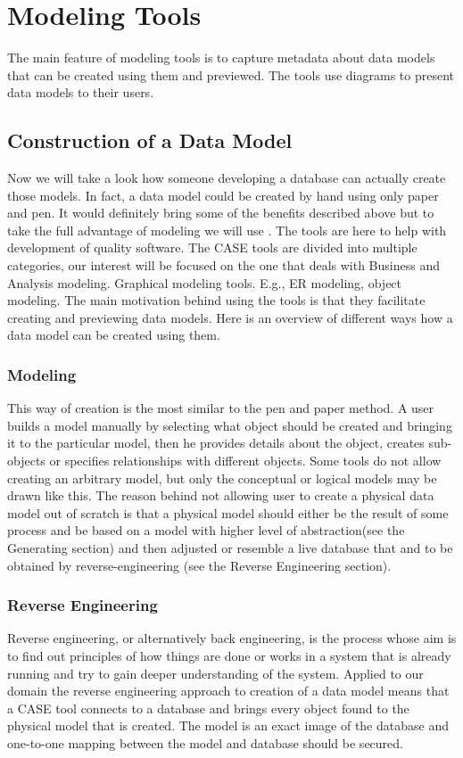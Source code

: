 \chapter{Modeling Tools}

The main feature of modeling tools is to capture metadata about data models that can be created using them and previewed. The tools use diagrams to present data models to their users.

\section{Construction of a Data Model}

Now we will take a look how someone developing a database can actually create those models.
In fact, a data model could be created by hand using only paper and pen. It would definitely bring some of the benefits described above but to take the full advantage of modeling we will use . The tools are here to help with development of quality software. The CASE tools are divided into multiple categories, our interest will be focused on the one that deals with Business and Analysis modeling. Graphical modeling tools. E.g., ER modeling, object modeling.
The main motivation behind using the tools is that they facilitate creating and previewing data models. Here is an overview of different ways how a data model can be created using them.

\subsection{Modeling}

This way of creation is the most similar to the pen and paper method. A user builds a model manually by selecting what object should be created and bringing it to the particular model, then he provides details about the object, creates sub-objects or specifies relationships with different objects.
Some tools do not allow creating an arbitrary model, but only the conceptual or logical models may be drawn like this. 
The reason behind not allowing user to create a physical data model out of scratch is that a physical model should either be the result of some process and be based on a model with higher level of abstraction(see the Generating section) and then adjusted or resemble a live database that and to be obtained by reverse-engineering (see the Reverse Engineering section).

\subsection{Reverse Engineering}
Reverse engineering, or alternatively back engineering, is the process whose aim is to find out principles of how things are done or works in a system that is already running and try to gain deeper understanding of the system.
Applied to our domain the reverse engineering approach to creation of a data model means that a CASE tool connects to a database and brings every object found to the physical model that is created.  The model is an exact image of the database and one-to-one mapping between the model and database should be secured.

